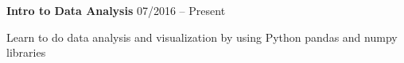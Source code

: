 \documentclass[margin,line]{resume}
\begin{document}
\begin{resume}
    \textbf{Intro to Data Analysis} \hfill 07/2016 -- Present \vspace{-3mm}\\\vspace{-1mm}%
      \begin{list2}
       \item Learn to do data analysis and visualization by using Python pandas and numpy libraries
      \end{list2}
    \vspace{-2mm}


\end{resume}
\end{document}
